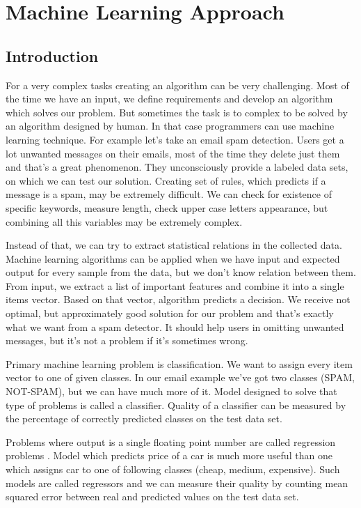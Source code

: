 \documentclass[declaration,shortabstract,english,inz]{iithesis}
\begin{document}
\chapter{Machine Learning Approach}

\section{Introduction}


For a very complex tasks creating an algorithm can be very challenging.
Most of the time we have an input, we define requirements and develop an algorithm which solves our problem.
But sometimes the task is to complex to be solved by an algorithm designed by human.
In that case programmers can use machine learning technique.
For example let's take an email spam detection.
Users get a lot  unwanted messages on their emails, most of the time they delete just them and that's a great phenomenon.
They unconsciously provide a labeled data sets, on which we can test our solution.
Creating set of rules, which predicts if a message is a spam, may be extremely difficult.
We can check for existence of specific keywords, measure length, check upper case letters appearance, but combining all this variables may be extremely complex.

Instead of that, we can try to extract statistical relations in the collected data.
Machine learning algorithms can be applied when we have input and expected output for every sample from the data, but we don't know relation between them.
From input, we extract a list of important features and combine it into a single items vector.
Based on that vector, algorithm predicts a decision. 
We receive not optimal, but approximately good solution for our problem and that's exactly what we want from a spam detector.
It should help users in omitting unwanted messages, but it's not a problem if it's sometimes wrong.

Primary machine learning problem is classification\cite{Introduction_ML}.
We want to assign every item vector to one of given classes.
In our email example we've got two classes (SPAM, NOT-SPAM), but we can have much more of it.
Model designed to solve that type of problems is called a classifier.
Quality of a classifier can be measured by the percentage of correctly predicted classes on the test data set.

Problems where output is a single floating point number are called regression problems \cite{Introduction_ML}.
Model which predicts price of a car is much more useful than one which assigns car to one of following classes  (cheap, medium, expensive).
Such models are called regressors and we can measure their quality by counting mean squared error between real and predicted values on the test data set.
\end{document}
